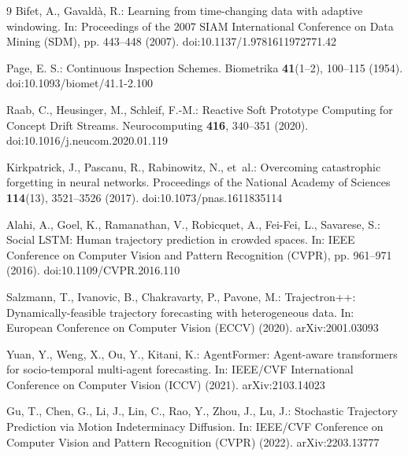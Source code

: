 \documentclass[runningheads]{llncs}
\begin{document}
\begin{thebibliography}{9}
Bifet, A., Gavald\`a, R.: Learning from time-changing data with adaptive windowing. In: Proceedings of the 2007 SIAM International Conference on Data Mining (SDM), pp. 443--448 (2007). doi:10.1137/1.9781611972771.42

Page, E. S.: Continuous Inspection Schemes. Biometrika \textbf{41}(1--2), 100--115 (1954). doi:10.1093/biomet/41.1-2.100

Raab, C., Heusinger, M., Schleif, F.-M.: Reactive Soft Prototype Computing for Concept Drift Streams. Neurocomputing \textbf{416}, 340--351 (2020). doi:10.1016/j.neucom.2020.01.119

Kirkpatrick, J., Pascanu, R., Rabinowitz, N., et~al.: Overcoming catastrophic forgetting in neural networks. Proceedings of the National Academy of Sciences \textbf{114}(13), 3521--3526 (2017). doi:10.1073/pnas.1611835114

Alahi, A., Goel, K., Ramanathan, V., Robicquet, A., Fei-Fei, L., Savarese, S.: Social LSTM: Human trajectory prediction in crowded spaces. In: IEEE Conference on Computer Vision and Pattern Recognition (CVPR), pp. 961--971 (2016). doi:10.1109/CVPR.2016.110

Salzmann, T., Ivanovic, B., Chakravarty, P., Pavone, M.: Trajectron++: Dynamically-feasible trajectory forecasting with heterogeneous data. In: European Conference on Computer Vision (ECCV) (2020). arXiv:2001.03093

Yuan, Y., Weng, X., Ou, Y., Kitani, K.: AgentFormer: Agent-aware transformers for socio-temporal multi-agent forecasting. In: IEEE/CVF International Conference on Computer Vision (ICCV) (2021). arXiv:2103.14023

Gu, T., Chen, G., Li, J., Lin, C., Rao, Y., Zhou, J., Lu, J.: Stochastic Trajectory Prediction via Motion Indeterminacy Diffusion. In: IEEE/CVF Conference on Computer Vision and Pattern Recognition (CVPR) (2022). arXiv:2203.13777

\end{thebibliography}
\end{document}
